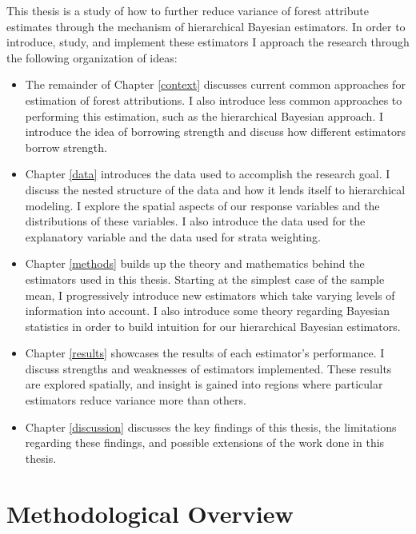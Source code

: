 \documentclass[12pt,twoside]{reedthesis}
\providecommand{\tightlist}{%
  \setlength{\itemsep}{0pt}\setlength{\parskip}{0pt}}
\begin{document}
This thesis is a study of how to further reduce variance of forest attribute estimates through the mechanism of hierarchical Bayesian estimators. In order to introduce, study, and implement these estimators I approach the research through the following organization of ideas:
\begin{itemize}
\tightlist
\item
  The remainder of Chapter \ref{context} discusses current common approaches for estimation of forest attributions. I also introduce less common approaches to performing this estimation, such as the hierarchical Bayesian approach. I introduce the idea of borrowing strength and discuss how different estimators borrow strength.
\item
  Chapter \ref{data} introduces the data used to accomplish the research goal. I discuss the nested structure of the data and how it lends itself to hierarchical modeling. I explore the spatial aspects of our response variables and the distributions of these variables. I also introduce the data used for the explanatory variable and the data used for strata weighting.
\item
  Chapter \ref{methods} builds up the theory and mathematics behind the estimators used in this thesis. Starting at the simplest case of the sample mean, I progressively introduce new estimators which take varying levels of information into account. I also introduce some theory regarding Bayesian statistics in order to build intuition for our hierarchical Bayesian estimators.
\item
  Chapter \ref{results} showcases the results of each estimator's performance. I discuss strengths and weaknesses of estimators implemented. These results are explored spatially, and insight is gained into regions where particular estimators reduce variance more than others.
\item
  Chapter \ref{discussion} discusses the key findings of this thesis, the limitations regarding these findings, and possible extensions of the work done in this thesis.
\end{itemize}
\hypertarget{methodological-overview}{%
\section{Methodological Overview}\label{methodological-overview}}
\end{document}
